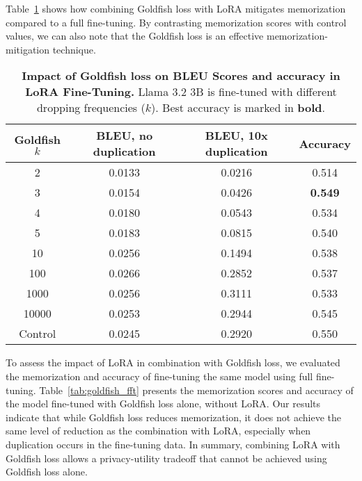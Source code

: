 Table~\ref{tab:goldfish_lora} shows how combining Goldfish loss with LoRA mitigates memorization compared to a full fine-tuning. By contrasting memorization scores with control values, we can also note that the Goldfish loss is an effective memorization-mitigation technique.

\begin{table}[ht]
\caption{\textbf{Impact of Goldfish loss on BLEU Scores and accuracy in LoRA Fine-Tuning.} Llama 3.2 3B is fine-tuned with different dropping frequencies ($k$). Best accuracy is marked in \textbf{bold}.}
\label{tab:goldfish_lora}
\vskip 0.15in
\begin{center}
\begin{scriptsize}
\begin{tabular}{@{}c|ccc@{}}
\toprule
Goldfish $k$ & BLEU, no duplication & BLEU, 10x duplication & Accuracy       \\ \midrule
2            & 0.0133          & 0.0216          & 0.514          \\
3            & 0.0154          & 0.0426         & \textbf{0.549} \\
4            & 0.0180          & 0.0543          & 0.534          \\
5            & 0.0183          & 0.0815          & 0.540          \\
10           & 0.0256          & 0.1494          & 0.538          \\
100          & 0.0266          & 0.2852          & 0.537          \\
1000         & 0.0256          & 0.3111          & 0.533          \\
10000        & 0.0253          & 0.2944          & 0.545          \\
Control      & 0.0245          & 0.2920          & 0.550         \\ 
\bottomrule
\end{tabular}
\end{scriptsize}
\end{center}
\vskip -0.1in
\end{table}

To assess the impact of LoRA in combination with Goldfish loss, we evaluated the memorization and accuracy of fine-tuning the same model using full fine-tuning. Table~\ref{tab:goldfish_fft} presents the memorization scores and accuracy of the model fine-tuned with Goldfish loss alone, without LoRA. Our results indicate that while Goldfish loss reduces memorization, it does not achieve the same level of reduction as the combination with LoRA, especially when duplication occurs in the fine-tuning data. In summary, combining LoRA with Goldfish loss allows a privacy-utility tradeoff that cannot be achieved using Goldfish loss alone.


